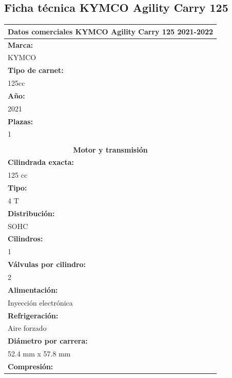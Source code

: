 \subsection{Ficha técnica KYMCO Agility Carry 125}
\label{subanexo: ficha tecnica kymco 125}

\begin{table}[H]
\centering
\begin{tabular}{l}
\multicolumn{1}{c}{\textbf{Datos comerciales KYMCO Agility Carry 125 2021-2022}} \\ \hline
\textbf{Marca:}                  \\
KYMCO                            \\
\textbf{Tipo de carnet:}         \\
125cc                            \\
\textbf{Año:}                    \\
2021                             \\
\textbf{Plazas:}                 \\
1                                \\
                                 \\
\multicolumn{1}{c}{\textbf{Motor y transmisión}}                                 \\ \hline
\textbf{Cilindrada exacta:}      \\
125 cc                           \\
\textbf{Tipo:}                   \\
4 T                              \\
\textbf{Distribución:}           \\
SOHC                             \\
\textbf{Cilindros:}              \\
1                                \\
\textbf{Válvulas por cilindro:}  \\
2                                \\
\textbf{Alimentación:}           \\
Inyección electrónica            \\
\textbf{Refrigeración:}          \\
Aire forzado                     \\
\textbf{Diámetro por carrera:}   \\
52.4 mm x 57.8 mm                \\
\textbf{Compresión:}             \\

\end{tabular}
\end{table}
